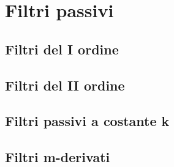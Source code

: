\documentclass[../main.tex]{subfiles}
\begin{document}
\section{Filtri passivi}

\subsection{Filtri del I ordine}


\subsection{Filtri del II ordine}


\subsection{Filtri passivi a costante k}

\subsection{Filtri m-derivati}
\end{document}
